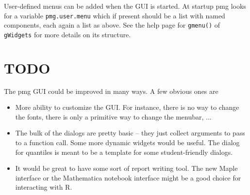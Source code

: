 \documentclass[12pt]{article}
\newcommand{\RCode}[1]{\texttt{#1}}
\newcommand{\RFunc}[1]{\texttt{#1()}}
\begin{document}
User-defined menus can be added when the GUI is started. At startup
pmg looks for a variable \RCode{pmg.user.menu} which if present should
be a list with named components, each again a list as above. See the
help page for \RFunc{gmenu} of \RCode{gWidgets} for more details on
its structure.

\section{TODO}
The pmg GUI could be improved in many ways. A few obvious ones are
\begin{itemize}
\item More ability to customize the GUI. For instance, there is no way
  to change the fonts, there is only a primitive way to change the
  menubar, ...
\item The bulk of the dialogs are pretty basic -- they just collect
  arguments to pass to a function call. Some more dynamic widgets
  would be useful. The dialog for quantiles is meant to be a template
  for some student-friendly dialogs.
\item It would be great to have some sort of report writing tool. The
  new Maple interface or the Mathematica notebook interface might be a
  good choice for interacting with R.
\end{itemize}
\end{document}
